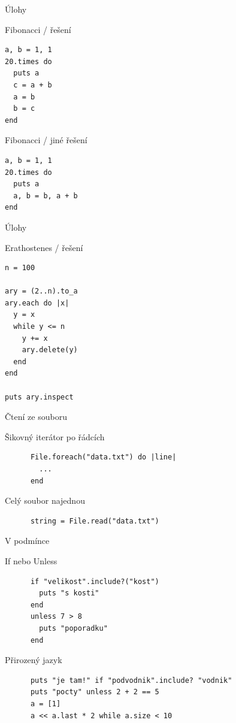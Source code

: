 \documentclass{beamer}
\begin{document}
\begin{frame}[fragile]{Úlohy}
  \begin{block}{Fibonacci / řešení} \footnotesize
\begin{verbatim}
a, b = 1, 1
20.times do
  puts a
  c = a + b
  a = b
  b = c
end
\end{verbatim}
  \end{block}
  \begin{block}{Fibonacci / jiné řešení} \footnotesize
\begin{verbatim}
a, b = 1, 1
20.times do
  puts a
  a, b = b, a + b
end
\end{verbatim}
  \end{block}
\end{frame}

\begin{frame}[fragile]{Úlohy}
  \begin{block}{Erathostenes / řešení}
\begin{verbatim}
n = 100

ary = (2..n).to_a
ary.each do |x|
  y = x
  while y <= n
    y += x
    ary.delete(y)
  end
end

puts ary.inspect
\end{verbatim}
  \end{block}
\end{frame}

\begin{frame}[fragile]{Čtení ze souboru}
  \begin{block}{Šikovný iterátor po řádcích}
    \begin{verbatim}
      File.foreach("data.txt") do |line|
        ...
      end
    \end{verbatim}
  \end{block}
  \pause
  \begin{block}{Celý soubor najednou}
    \begin{verbatim}
      string = File.read("data.txt")
    \end{verbatim}
  \end{block}
\end{frame}

\begin{frame}[fragile]{V podmínce}
  \begin{block}{If nebo Unless}
    \scriptsize
    \begin{verbatim}
      if "velikost".include?("kost")
        puts "s kosti"
      end
      unless 7 > 8
        puts "poporadku"
      end
    \end{verbatim}
  \end{block}
  \pause
  \begin{block}{Přirozený jazyk}
    \scriptsize
    \begin{verbatim}
      puts "je tam!" if "podvodnik".include? "vodnik"
      puts "pocty" unless 2 + 2 == 5
      a = [1]
      a << a.last * 2 while a.size < 10
    \end{verbatim}
  \end{block}
\end{frame}
\end{document}
